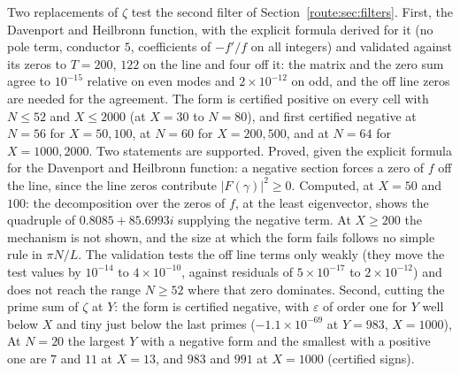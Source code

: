 Two replacements of $\zeta$ test the second filter of Section~\ref{route:sec:filters}. First, the Davenport and Heilbronn function, with the explicit formula derived for it (no pole term, conductor $5$, coefficients of $-f'/f$ on all integers) and validated against its zeros to $T=200$, $122$ on the line and four off it: the matrix and the zero sum agree to $10^{-15}$ relative on even modes and $2\times10^{-12}$ on odd, and the off line zeros are needed for the agreement. The form is certified positive on every cell with $N\le52$ and $X\le2000$ (at $X=30$ to $N=80$), and first certified negative at $N=56$ for $X=50,100$, at $N=60$ for $X=200,500$, and at $N=64$ for $X=1000,2000$. Two statements are supported. Proved, given the explicit formula for the Davenport and Heilbronn function: a negative section forces a zero of $f$ off the line, since the line zeros contribute $|F(\gamma)|^2\ge0$. Computed, at $X=50$ and $100$: the decomposition over the zeros of $f$, at the least eigenvector, shows the quadruple of $0.8085+85.6993i$ supplying the negative term. At $X\ge200$ the mechanism is not shown, and the size at which the form fails follows no simple rule in $\pi N/L$. The validation tests the off line terms only weakly (they move the test values by $10^{-14}$ to $4\times10^{-10}$, against residuals of $5\times10^{-17}$ to $2\times10^{-12}$) and does not reach the range $N\ge52$ where that zero dominates. Second, cutting the prime sum of $\zeta$ at $Y$: the form is certified negative, with $\varepsilon$ of order one for $Y$ well below $X$ and tiny just below the last primes ($-1.1\times10^{-69}$ at $Y=983$, $X=1000$), At $N=20$ the largest $Y$ with a negative form and the smallest with a positive one are $7$ and $11$ at $X=13$, and $983$ and $991$ at $X=1000$ (certified signs).


